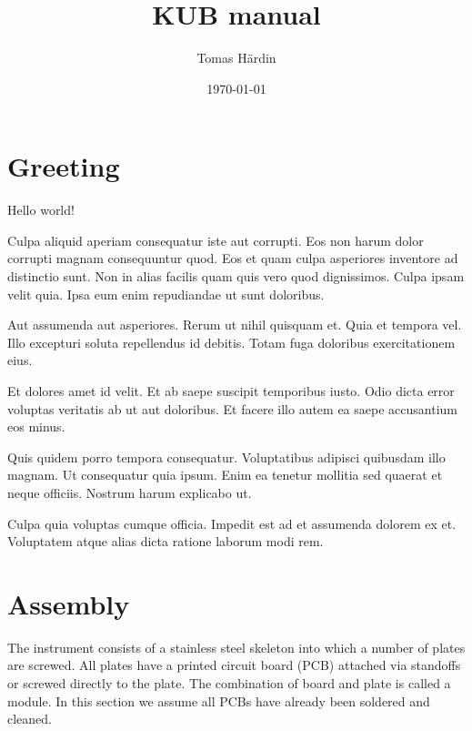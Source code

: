 \documentclass{article}
\begin{document}
\lstset{basicstyle=\ttfamily} %

\title{KUB manual}
\date{\today}
\author{Tomas H\"ardin}

\maketitle

\newpage

\tableofcontents
\listoffigures
\listoftables

\newpage

\section{Greeting}
Hello world!



Culpa aliquid aperiam consequatur iste aut corrupti. Eos non harum dolor corrupti magnam consequuntur quod. Eos et quam culpa asperiores inventore ad distinctio sunt. Non in alias facilis quam quis vero quod dignissimos. Culpa ipsam velit quia. Ipsa eum enim repudiandae ut sunt doloribus.

Aut assumenda aut asperiores. Rerum ut nihil quisquam et. Quia et tempora vel. Illo excepturi soluta repellendus id debitis. Totam fuga doloribus exercitationem eius.

Et dolores amet id velit. Et ab saepe suscipit temporibus iusto. Odio dicta error voluptas veritatis ab ut aut doloribus. Et facere illo autem ea saepe accusantium eos minus.

Quis quidem porro tempora consequatur. Voluptatibus adipisci quibusdam illo magnam. Ut consequatur quia ipsum. Enim ea tenetur mollitia sed quaerat et neque officiis. Nostrum harum explicabo ut.

Culpa quia voluptas cumque officia. Impedit est ad et assumenda dolorem ex et. Voluptatem atque alias dicta ratione laborum modi rem.

\section{Assembly}


The instrument consists of a stainless steel skeleton into which a number of plates are screwed.
All plates have a printed circuit board (PCB) attached via standoffs or screwed directly to the plate.
The combination of board and plate is called a module.
In this section we assume all PCBs have already been soldered and cleaned.
\end{document}
